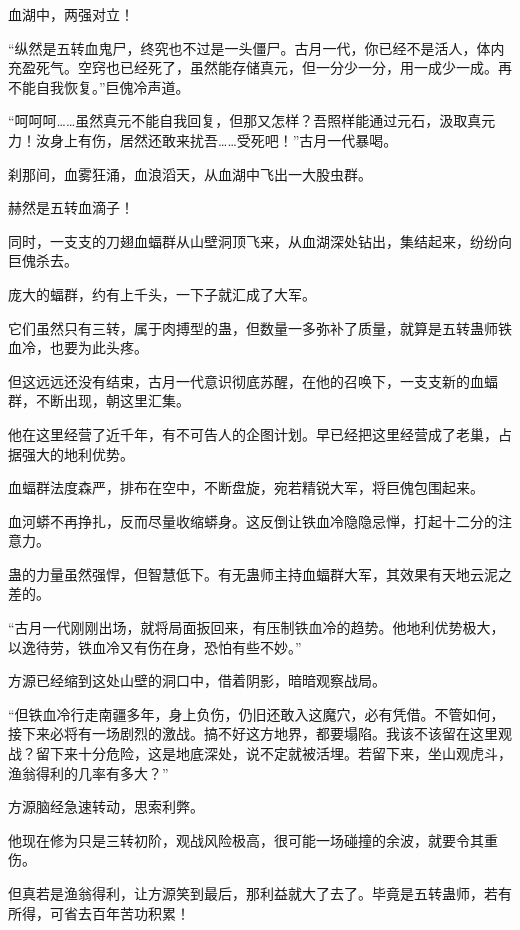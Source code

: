 
\begin{this_body}

血湖中，两强对立！

“纵然是五转血鬼尸，终究也不过是一头僵尸。古月一代，你已经不是活人，体内充盈死气。空窍也已经死了，虽然能存储真元，但一分少一分，用一成少一成。再不能自我恢复。”巨傀冷声道。

“呵呵呵……虽然真元不能自我回复，但那又怎样？吾照样能通过元石，汲取真元力！汝身上有伤，居然还敢来扰吾……受死吧！”古月一代暴喝。

刹那间，血雾狂涌，血浪滔天，从血湖中飞出一大股虫群。

赫然是五转血滴子！

同时，一支支的刀翅血蝠群从山壁洞顶飞来，从血湖深处钻出，集结起来，纷纷向巨傀杀去。

庞大的蝠群，约有上千头，一下子就汇成了大军。

它们虽然只有三转，属于肉搏型的蛊，但数量一多弥补了质量，就算是五转蛊师铁血冷，也要为此头疼。

但这远远还没有结束，古月一代意识彻底苏醒，在他的召唤下，一支支新的血蝠群，不断出现，朝这里汇集。

他在这里经营了近千年，有不可告人的企图计划。早已经把这里经营成了老巢，占据强大的地利优势。

血蝠群法度森严，排布在空中，不断盘旋，宛若精锐大军，将巨傀包围起来。

血河蟒不再挣扎，反而尽量收缩蟒身。这反倒让铁血冷隐隐忌惮，打起十二分的注意力。

蛊的力量虽然强悍，但智慧低下。有无蛊师主持血蝠群大军，其效果有天地云泥之差的。

“古月一代刚刚出场，就将局面扳回来，有压制铁血冷的趋势。他地利优势极大，以逸待劳，铁血冷又有伤在身，恐怕有些不妙。”

方源已经缩到这处山壁的洞口中，借着阴影，暗暗观察战局。

“但铁血冷行走南疆多年，身上负伤，仍旧还敢入这魔穴，必有凭借。不管如何，接下来必将有一场剧烈的激战。搞不好这方地界，都要塌陷。我该不该留在这里观战？留下来十分危险，这是地底深处，说不定就被活埋。若留下来，坐山观虎斗，渔翁得利的几率有多大？”

方源脑经急速转动，思索利弊。

他现在修为只是三转初阶，观战风险极高，很可能一场碰撞的余波，就要令其重伤。

但真若是渔翁得利，让方源笑到最后，那利益就大了去了。毕竟是五转蛊师，若有所得，可省去百年苦功积累！


\end{this_body}
